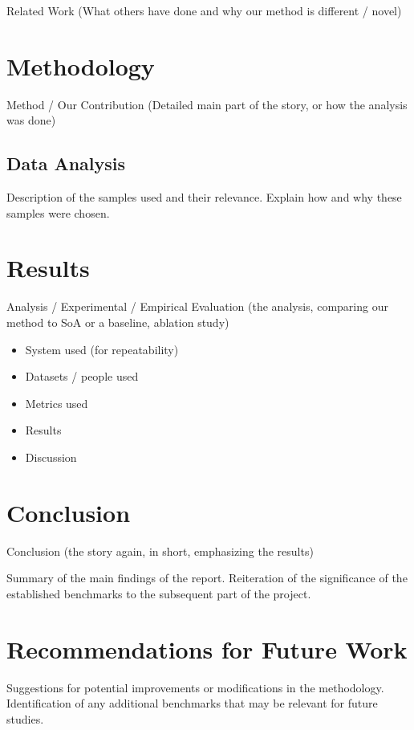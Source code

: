 Related Work (What others have done and why our method is different / novel)

\section{Methodology}
Method / Our Contribution (Detailed main part of the story, or how the analysis was done)

\subsection{Data Analysis}
Description of the samples used and their relevance.
Explain how and why these samples were chosen.

\section{Results}
Analysis / Experimental / Empirical Evaluation (the analysis, comparing our method to SoA or a baseline, ablation study)
\begin{itemize}
    \item System used (for repeatability)
    \item Datasets / people used
    \item Metrics used
    \item Results
    \item Discussion
\end{itemize}

\section{Conclusion}
Conclusion (the story again, in short, emphasizing the results)

Summary of the main findings of the report.
Reiteration of the significance of the established benchmarks to the subsequent part of the project.

\section{Recommendations for Future Work}
Suggestions for potential improvements or modifications in the methodology.
Identification of any additional benchmarks that may be relevant for future studies.
